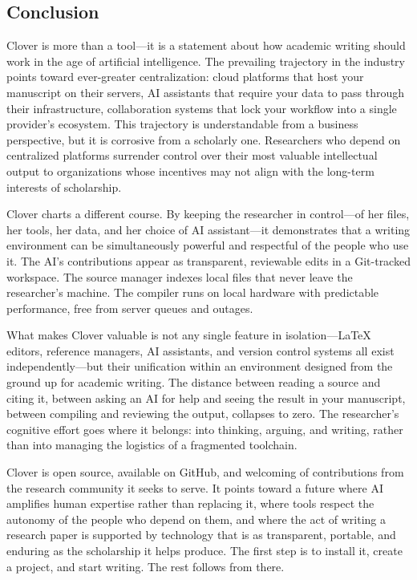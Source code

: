 \documentclass[a4paper,11pt]{article}
\begin{document}
\subsection{Conclusion}

Clover is more than a tool---it is a statement about how academic writing should work in the age of artificial intelligence. The prevailing trajectory in the industry points toward ever-greater centralization: cloud platforms that host your manuscript on their servers, AI assistants that require your data to pass through their infrastructure, collaboration systems that lock your workflow into a single provider's ecosystem. This trajectory is understandable from a business perspective, but it is corrosive from a scholarly one. Researchers who depend on centralized platforms surrender control over their most valuable intellectual output to organizations whose incentives may not align with the long-term interests of scholarship.

Clover charts a different course. By keeping the researcher in control---of her files, her tools, her data, and her choice of AI assistant---it demonstrates that a writing environment can be simultaneously powerful and respectful of the people who use it. The AI's contributions appear as transparent, reviewable edits in a Git-tracked workspace. The source manager indexes local files that never leave the researcher's machine. The compiler runs on local hardware with predictable performance, free from server queues and outages.

What makes Clover valuable is not any single feature in isolation---\LaTeX{} editors, reference managers, AI assistants, and version control systems all exist independently---but their unification within an environment designed from the ground up for academic writing. The distance between reading a source and citing it, between asking an AI for help and seeing the result in your manuscript, between compiling and reviewing the output, collapses to zero. The researcher's cognitive effort goes where it belongs: into thinking, arguing, and writing, rather than into managing the logistics of a fragmented toolchain.

Clover is open source, available on GitHub, and welcoming of contributions from the research community it seeks to serve. It points toward a future where AI amplifies human expertise rather than replacing it, where tools respect the autonomy of the people who depend on them, and where the act of writing a research paper is supported by technology that is as transparent, portable, and enduring as the scholarship it helps produce. The first step is to install it, create a project, and start writing. The rest follows from there.

\newpage
\printbibliography
\end{document}
